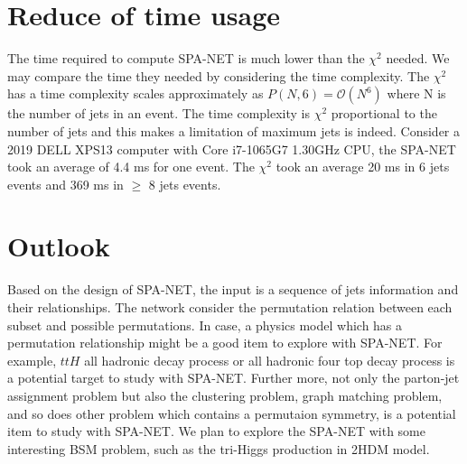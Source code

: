 \section{Reduce of time usage}\label{sec: reduce of time uasge}
The time required to compute SPA-NET is much lower than the $\chi^{2}$ needed. We may compare the time they needed by considering the time complexity. The $\chi^{2}$ has a time complexity scales approximately as $P(N,6)=\mathcal{O}(N^{6})$ where N is the number of jets in an event. The time complexity is $\chi^{2}$ proportional to the number of jets and this makes a limitation of maximum jets is indeed. Consider a 2019 DELL XPS13 computer with Core i7-1065G7 1.30GHz CPU, the SPA-NET took an average of 4.4 ms for one event.  The $\chi^{2}$ took an average 20 ms in 6 jets events and 369 ms in $\ge$ 8 jets events. 
\section{Outlook}\label{sec:outlook}
Based on the design of SPA-NET, the input is a sequence of jets information and their relationships. The network consider the permutation relation between each subset and possible permutations. In case, a physics model which has a permutation relationship might be a good item to explore with SPA-NET. For example, $ttH$ all hadronic decay process or all hadronic four top decay process is a potential target to study with SPA-NET. Further more, not only the parton-jet assignment problem but also the clustering problem, graph matching problem, and so does other problem which contains a permutaion symmetry, is a potential item to study with SPA-NET. We plan to explore the SPA-NET with some interesting BSM problem, such as the tri-Higgs production in 2HDM model.\cite{Low:2020iua}



